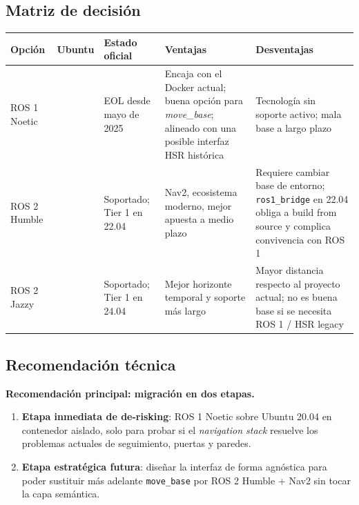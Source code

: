 \documentclass[11pt,a4paper]{article}
\begin{document}
\subsection{Matriz de decisión}

\begin{center}
\begin{tabular}{>{\raggedright\arraybackslash}p{3cm} >{\raggedright\arraybackslash}p{2.4cm} >{\raggedright\arraybackslash}p{3.2cm} >{\raggedright\arraybackslash}p{4.3cm} >{\raggedright\arraybackslash}p{3.2cm}}
\toprule
\textbf{Opción} & \textbf{Ubuntu} & \textbf{Estado oficial} & \textbf{Ventajas} & \textbf{Desventajas} \\
\midrule
ROS 1 Noetic & 20.04 & EOL desde mayo de 2025 & Encaja con el Docker actual; buena opción para \textit{move\_base}; alineado con una posible interfaz HSR histórica & Tecnología sin soporte activo; mala base a largo plazo \\
\addlinespace
ROS 2 Humble & 22.04 & Soportado; Tier 1 en 22.04 & Nav2, ecosistema moderno, mejor apuesta a medio plazo & Requiere cambiar base de entorno; \texttt{ros1\_bridge} en 22.04 obliga a build from source y complica convivencia con ROS 1 \\
\addlinespace
ROS 2 Jazzy & 24.04 & Soportado; Tier 1 en 24.04 & Mejor horizonte temporal y soporte más largo & Mayor distancia respecto al proyecto actual; no es buena base si se necesita ROS 1 / HSR legacy \\
\bottomrule
\end{tabular}
\end{center}

\subsection{Recomendación técnica}

\textbf{Recomendación principal: migración en dos etapas.}

\begin{enumerate}
  \item \textbf{Etapa inmediata de de-risking}: ROS 1 Noetic sobre Ubuntu 20.04
        en contenedor aislado, solo para probar si el \textit{navigation stack}
        resuelve los problemas actuales de seguimiento, puertas y paredes.
  \item \textbf{Etapa estratégica futura}: diseñar la interfaz de forma
        agnóstica para poder sustituir más adelante \texttt{move\_base} por
        ROS 2 Humble + Nav2 sin tocar la capa semántica.
\end{enumerate}
\end{document}
